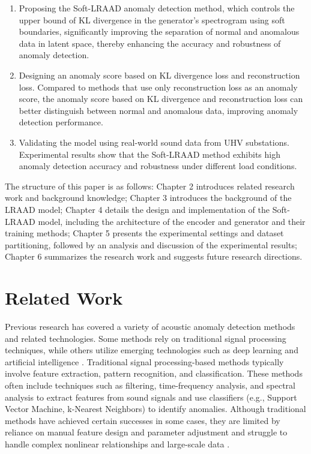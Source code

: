 \documentclass{article}
\begin{document}
\begin{enumerate}

  \item Proposing the Soft-LRAAD anomaly detection method, which controls the upper bound of KL divergence in the generator's spectrogram using soft boundaries, significantly improving the separation of normal and anomalous data in latent space, thereby enhancing the accuracy and robustness of anomaly detection.

  \item Designing an anomaly score based on KL divergence loss and reconstruction loss. Compared to methods that use only reconstruction loss as an anomaly score, the anomaly score based on KL divergence and reconstruction loss can better distinguish between normal and anomalous data, improving anomaly detection performance.

  \item Validating the model using real-world sound data from UHV substations. Experimental results show that the Soft-LRAAD method exhibits high anomaly detection accuracy and robustness under different load conditions.

\end{enumerate}

The structure of this paper is as follows: Chapter 2 introduces related research work and background knowledge; Chapter 3 introduces the background of the LRAAD model; Chapter 4 details the design and implementation of the Soft-LRAAD model, including the architecture of the encoder and generator and their training methods; Chapter 5 presents the experimental settings and dataset partitioning, followed by an analysis and discussion of the experimental results; Chapter 6 summarizes the research work and suggests future research directions.

\section{Related Work}

Previous research has covered a variety of acoustic anomaly detection methods and related technologies. Some methods rely on traditional signal processing techniques, while others utilize emerging technologies such as deep learning and artificial intelligence \cite{mnasri2022anomalous, jombo2023acoustic}. Traditional signal processing-based methods typically involve feature extraction, pattern recognition, and classification. These methods often include techniques such as filtering, time-frequency analysis, and spectral analysis to extract features from sound signals and use classifiers (e.g., Support Vector Machine, k-Nearest Neighbors) to identify anomalies. Although traditional methods have achieved certain successes in some cases, they are limited by reliance on manual feature design and parameter adjustment and struggle to handle complex nonlinear relationships and large-scale data \cite{pang2021deep, chalapathy2019deep, shi2021equipment}.
\end{document}
